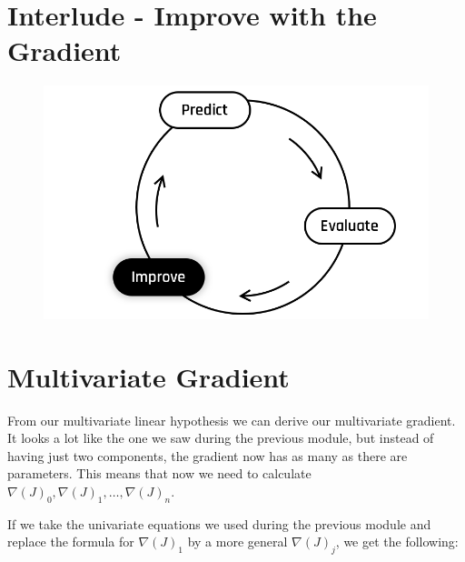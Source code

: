
\section*{Interlude - Improve with the Gradient}

\begin{figure}[!h]
    \centering
    \includegraphics[scale=0.25]{assets/Improve.png}
\end{figure}

\section*{Multivariate Gradient}
From our multivariate linear hypothesis we can derive our multivariate gradient.
It looks a lot like the one we saw during the previous module, but instead of having just two components, the gradient now has as many as there are parameters.
This means that now we need to calculate $\nabla(J)_0,\nabla(J)_1,\dots,\nabla(J)_n$.


If we take the univariate equations we used during the previous module and replace the formula for $\nabla(J)_1$ by a more general $\nabla(J)_j$, we get the following:

